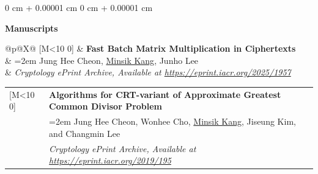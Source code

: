\documentclass[10pt, letterpaper]{article}
\makeatletter
\newenvironment{onecolentry}{
    \begin{adjustwidth}{
        0 cm + 0.00001 cm
    }{
        0 cm + 0.00001 cm
    }
}{
    \end{adjustwidth}
} %
\DeclareRobustCommand{\me}{\uline{Minsik Kang}}
\newlength{\MLabelW}\settowidth{\MLabelW}{\textbf{[M99]}}
\newcounter{Mctr}
\newcommand{\Mitem}[3]{%
  \noindent\begin{tabularx}{\linewidth}{@{}p{\MLabelW}@{\hspace{0.6em}}X@{}}
    {[M\ifnum\value{Mctr}<10 0\fi\arabic{Mctr}]} &
    \textbf{#1}\\
    & {\hangindent=2em \hangafter=-1 #2}\\
    & \textit{#3}\\
  \end{tabularx}\par
  \addtocounter{Mctr}{-1}\vspace{0.4ex}
}
\makeatother
\begin{document}
        \begin{onecolentry}
            \textbf{Manuscripts}
        \end{onecolentry}
        
        \vspace{0.2 cm}

        \setcounter{Mctr}{2}
        \Mitem{Fast Batch Matrix Multiplication in Ciphertexts}{Jung Hee Cheon, \me, Junho Lee}{Cryptology ePrint Archive, Available at \href{https://eprint.iacr.org/2025/1957}{https://eprint.iacr.org/2025/1957}}
        \Mitem{Algorithms for CRT-variant of Approximate Greatest Common Divisor Problem}
        {Jung Hee Cheon, Wonhee Cho, \me, Jiseung Kim, and Changmin Lee}
        {Cryptology ePrint Archive, Available at \href{https://eprint.iacr.org/2019/195}{https://eprint.iacr.org/2019/195}}
\end{document}
